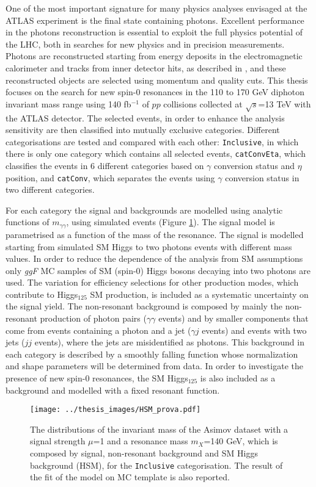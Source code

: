 \documentclass[a4paper, oneside, 11pt]{book}
\begin{document}
	One of the most important signature for many physics analyses envisaged at the ATLAS experiment is the final state containing photons. Excellent performance in the photons reconstruction is essential to exploit the full physics potential of the LHC, both in searches for new physics and in precision measurements. Photons are reconstructed starting from energy deposits in the electromagnetic calorimeter and tracks from inner detector hits, as described in \cite{Aad_2019}, and these reconstructed objects are selected using momentum and quality cuts. This thesis focuses on the search for new spin-0 resonances in the 110 to 170 GeV diphoton invariant mass range using 140 fb$^{-1}$ of $pp$ collisions collected at $\sqrt{s}$=13 TeV with the ATLAS detector. The selected events, in order to enhance the analysis sensitivity are then classified into mutually exclusive categories. Different categorisations are tested and compared with each other: \texttt{Inclusive}, in which there is only one category which contains all selected events, \texttt{catConvEta}, which classifies the events in 6 different categories based on $\gamma$ conversion status and $\eta$ position, and \texttt{catConv}, which separates the events using $\gamma$ conversion status in two different categories.
	
	For each category the signal and backgrounds are modelled using analytic functions of $m_{\gamma\gamma}$, using simulated events (Figure \ref{fig:mass_inv}). The signal model is parametrised as a function of the mass of the resonance. The signal is modelled starting from simulated SM Higgs to two photons events with different mass values. In order to reduce the dependence of the analysis from SM assumptions only \textit{ggF} MC samples of SM (spin-0) Higgs bosons decaying into two photons are used. The variation for efficiency selections for other production modes, which contribute to Higgs$_{125}$ SM production, is included as a systematic uncertainty on the signal yield. The non-resonant background is composed by mainly the non-resonant production of photon pairs ($\gamma\gamma$ events) and by smaller components that come from events containing a photon and a jet ($\gamma j$ events) and events with two jets ($jj$ events), where the jets are misidentified as photons. This background in each category is described by a smoothly falling function whose normalization and shape parameters will be determined from data. In order to investigate the presence of new spin-0 resonances, the SM Higgs$_{125}$ is also included as a background and modelled with a fixed resonant function.
	\begin{figure}
		\centering
		\texttt{[image: ../thesis\_images/HSM\_prova.pdf]}
		\caption{The distributions of the invariant mass of the Asimov dataset with a signal strength $\mu$=1 and a resonance mass $m_X$=140 GeV, which is composed by signal, non-resonant background and SM Higgs background (HSM), for the \texttt{Inclusive} categorisation. The result of the fit of the model on MC template is also reported.}
		\label{fig:mass_inv}
	\end{figure}
	
\end{document}
